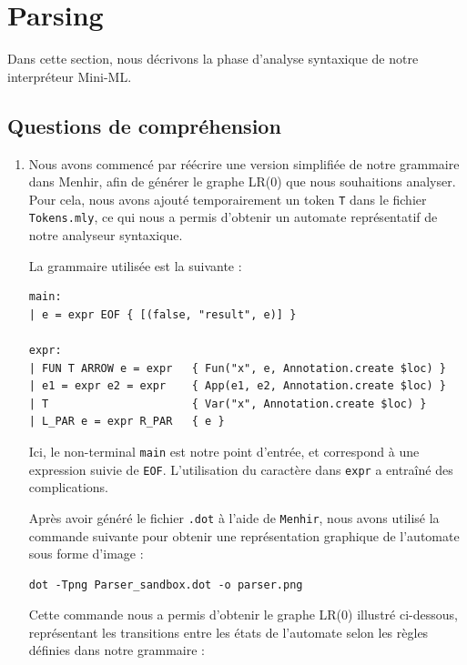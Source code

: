 \section{Parsing}

Dans cette section, nous décrivons la phase d'analyse syntaxique de notre interpréteur Mini-ML.

\subsection{Questions de compréhension}

\begin{enumerate}[label=\arabic*.]
    \item \label{question1}
          Nous avons commencé par réécrire une version simplifiée de notre grammaire dans Menhir, afin de générer le graphe LR(0) que nous souhaitions analyser.
          Pour cela, nous avons ajouté temporairement un token \texttt{T} dans le fichier \texttt{Tokens.mly}, ce qui nous a permis d’obtenir un automate représentatif de notre analyseur syntaxique.

          La grammaire utilisée est la suivante :

          \begin{lstlisting}[caption={Grammaire Menhir simplifiée}]
main:
| e = expr EOF { [(false, "result", e)] }

expr:
| FUN T ARROW e = expr   { Fun("x", e, Annotation.create $loc) }
| e1 = expr e2 = expr    { App(e1, e2, Annotation.create $loc) }
| T                      { Var("x", Annotation.create $loc) }
| L_PAR e = expr R_PAR   { e }
           \end{lstlisting}

          Ici, le non-terminal \texttt{main} est notre point d'entrée, et correspond à une expression suivie de \texttt{EOF}.
          L'utilisation du caractère \texttt{\textquotesingle} dans \texttt{expr\textquotesingle} a entraîné des complications.

          Après avoir généré le fichier \texttt{.dot} à l'aide de \texttt{Menhir}, nous avons utilisé la commande suivante pour obtenir une représentation graphique de l’automate sous forme d’image :

          \begin{lstlisting}[caption={Commande de génération de l'image}]
dot -Tpng Parser_sandbox.dot -o parser.png
          \end{lstlisting}

          Cette commande nous a permis d’obtenir le graphe LR(0) illustré ci-dessous, représentant les transitions entre les états de l’automate selon les règles définies dans notre grammaire :


\end{enumerate}
